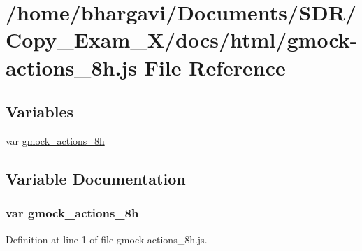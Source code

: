 \hypertarget{gmock-actions__8h_8js}{}\section{/home/bhargavi/\+Documents/\+S\+D\+R/\+Copy\+\_\+\+Exam\+\_\+X/docs/html/gmock-\/actions\+\_\+8h.js File Reference}
\label{gmock-actions__8h_8js}
\subsection*{Variables}
\begin{DoxyCompactItemize}
\item 
var \hyperlink{gmock-actions__8h_8js_a8fa91b2ed4637f7b9bdaae1878b30bc2}{gmock\+\_\+actions\+\_\+8h}
\end{DoxyCompactItemize}


\subsection{Variable Documentation}
\subsubsection[{\texorpdfstring{gmock\+\_\+actions\+\_\+8h}{gmock_actions_8h}}]{\setlength{\rightskip}{0pt plus 5cm}var gmock\+\_\+actions\+\_\+8h}\hypertarget{gmock-actions__8h_8js_a8fa91b2ed4637f7b9bdaae1878b30bc2}{}\label{gmock-actions__8h_8js_a8fa91b2ed4637f7b9bdaae1878b30bc2}


Definition at line 1 of file gmock-\/actions\+\_\+8h.\+js.


